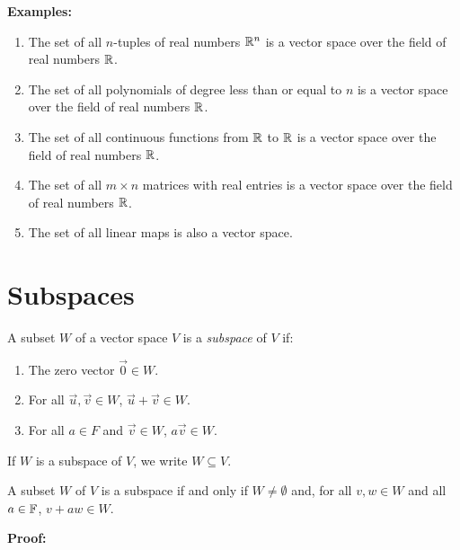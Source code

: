 \QED

\textbf{Examples:}

\begin{enumerate}

	\item The set of all \(n\)-tuples of real numbers \(\mathbb{R}^n\) is a vector space over the field
	      of real numbers \(\mathbb{R}\).

	\item The set of all polynomials of degree less than or equal to \(n\) is a vector space over the
	      field of real numbers \(\mathbb{R}\).

	\item The set of all continuous functions from \(\mathbb{R}\) to \(\mathbb{R}\) is a vector space
	      over the field of real numbers \(\mathbb{R}\).

	\item The set of all \(m \times n\) matrices with real entries is a vector space over the field of
	      real numbers \(\mathbb{R}\).

	\item The set of all linear maps is also a vector space.

\end{enumerate}

\section{Subspaces}

A subset \(W\) of a vector space \(V\) is a \emph{subspace} of \(V\) if:

\begin{enumerate}[label=\Roman*.]

	\item The zero vector \(\vec{0} \in W\).

	\item For all \(\vec{u}, \vec{v} \in W\), \(\vec{u} + \vec{v} \in W\).

	\item For all \(a \in F\) and \(\vec{v} \in W\), \(a\vec{v} \in W\).

\end{enumerate}

If \(W\) is a subspace of \(V\), we write \(W \subseteq V\).

A subset \(W\) of \(V\) is a subspace if and only if \(W \ne \emptyset \) and, for all
\(v,w \in W\) and all \(a \in \mathbb{F}\), \(v + aw \in W\).

\textbf{Proof:}

